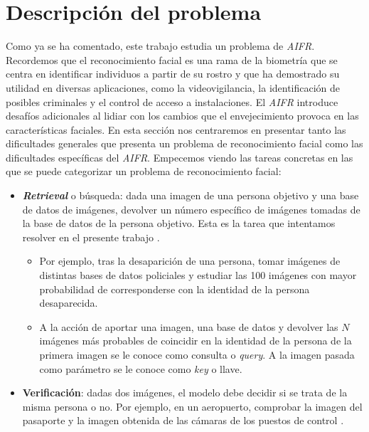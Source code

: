 \section{Descripción del problema} \label{ich:descrp_problema}

Como ya se ha comentado, este trabajo estudia un problema de \textit{AIFR}. Recordemos que el reconocimiento facial es una rama de la biometría que se centra en identificar individuos a partir de su rostro y que ha demostrado su utilidad en diversas aplicaciones, como la videovigilancia, la identificación de posibles criminales y el control de acceso a instalaciones. El \textit{AIFR} introduce desafíos adicionales al lidiar con los cambios que el envejecimiento provoca en las características faciales. En esta sección nos centraremos en presentar tanto las dificultades generales que presenta un problema de reconocimiento facial como las dificultades específicas del \textit{AIFR}. Empecemos viendo las tareas concretas en las que se puede categorizar un problema de reconocimiento facial:

\begin{itemize}
	\item \textbf{\textit{Retrieval}} o búsqueda: dada una imagen de una persona objetivo y una base de datos de imágenes, devolver un número específico de imágenes tomadas de la base de datos de la persona objetivo. Esta es la tarea que intentamos resolver en el presente trabajo \footnotemark.

	      \begin{itemize}
		      \item Por ejemplo, tras la desaparición de una persona, tomar imágenes de distintas bases de datos policiales y estudiar las 100 imágenes con mayor probabilidad de corresponderse con la identidad de la persona desaparecida.
		      \item A la acción de aportar una imagen, una base de datos y devolver las $N$ imágenes más probables de coincidir en la identidad de la persona de la primera imagen se le conoce como consulta o \textit{query}. A la imagen pasada como parámetro se le conoce como \textit{key} o llave.
	      \end{itemize}

	\item \textbf{Verificación}: dadas dos imágenes, el modelo debe decidir si se trata de la misma persona o no. Por ejemplo, en un aeropuerto, comprobar la imagen del pasaporte y la imagen obtenida de las cámaras de los puestos de control \cite{informatica:docface}.
\end{itemize}

